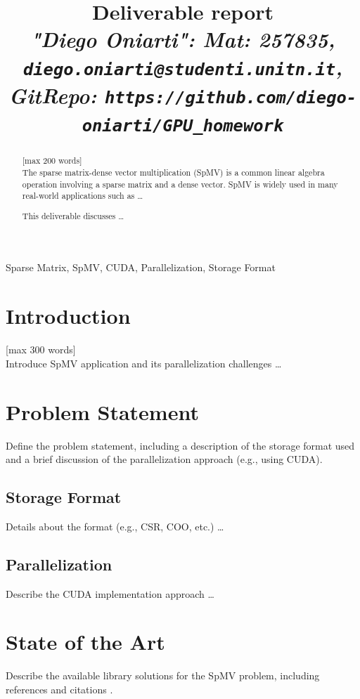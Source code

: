 \documentclass[conference]{IEEEtran}
\begin{document}
\title{Deliverable report \\
\footnotesize \textit{"Diego Oniarti": Mat: 257835, \texttt{diego.oniarti@studenti.unitn.it}, GitRepo: \texttt{https://github.com/diego-oniarti/GPU\_homework}}}

\maketitle

\begin{abstract}
[max 200 words]\\
The sparse matrix-dense vector multiplication (SpMV) is a common linear algebra operation involving a sparse matrix and a dense vector. SpMV is widely used in many real-world applications such as \dots

This deliverable discusses \dots
\end{abstract}

\begin{IEEEkeywords}
Sparse Matrix, SpMV, CUDA, Parallelization, Storage Format
\end{IEEEkeywords}

\section{Introduction}
[max 300 words]\\
Introduce SpMV application and its parallelization challenges \dots

\section{Problem Statement}
Define the problem statement, including a description of the storage format used and a brief discussion of the parallelization approach (e.g., using CUDA).

\subsection{Storage Format}
Details about the format (e.g., CSR, COO, etc.) \dots

\subsection{Parallelization}
Describe the CUDA implementation approach \dots

\section{State of the Art}
Describe the available library solutions for the SpMV problem, including references and citations \cite{asimov1950irobot, svevo1923coscienza, pirandello1926uno}.
\end{document}
